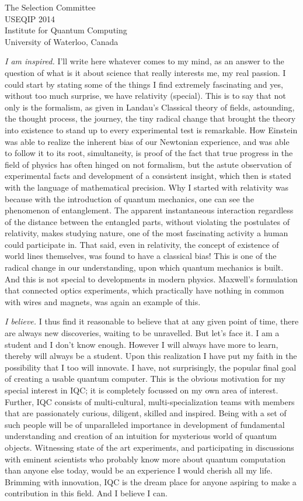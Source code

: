 \documentclass{letter}
\begin{document}
\begin{letter}{The Selection Committee\\USEQIP 2014\\Institute for Quantum Computing\\University of Waterloo, Canada}
\begin{enumerate}
\emph{I am inspired.} I'll write here whatever comes to my mind, as an answer to the question of what is it about science that really interests me, my real passion. I could start by stating some of the things I find extremely fascinating and yes, without too much surprise, we have relativity (special). This is to say that not only is the formalism, as given in Landau's Classical theory of fields, astounding, the thought process, the journey, the tiny radical change that brought the theory into existence to stand up to every experimental test is remarkable. How Einstein was able to realize the inherent bias of our Newtonian experience, and was able to follow it to its root, simultaneity, is proof of the fact that true progress in the field of physics has often hinged on not formalism, but the astute observation of experimental facts and development of a consistent insight, which then is stated with the language of mathematical precision. Why I started with relativity was because with the introduction of quantum mechanics, one can see the phenomenon of entanglement. The apparent instantaneous interaction regardless of the distance between the entangled parts, without violating the postulates of relativity, makes studying nature, one of the most fascinating activity a human could participate in. That said, even in relativity, the concept of existence of world lines themselves, was found to have a classical bias! This is one of the radical change in our understanding, upon which quantum mechanics is built. And this is not special to developments in modern physics. Maxwell's formulation that connected optics experiments, which practically have nothing in common with wires and magnets, was again an example of this.

\emph{I believe.} I thus find it reasonable to believe that at any given point of time, there are always new discoveries, waiting to be unravelled. But let's face it. I am a student and I don't know enough. However I will always have more to learn, thereby will always be a student. Upon this realization I have put my faith in the possibility that I too will innovate. I have, not surprisingly, the popular final goal of creating a usable quantum computer. This is the obvious motivation for my special interest in IQC; it is completely focussed on my own area of interest. Further, IQC consists of multi-cultural, multi-specialization teams with members that are passionately curious, diligent, skilled and inspired. Being with a set of such people will be of unparalleled importance in development of fundamental understanding and creation of an intuition for mysterious world of quantum objects. Witnessing state of the art experiments, and participating in discussions with eminent scientists who probably know more about quantum computation than anyone else today, would be an experience I would cherish all my life. Brimming with innovation, IQC is the dream place for anyone aspiring to make a contribution in this field. And I believe I can.



\end{enumerate}
\end{letter}
\end{document}

